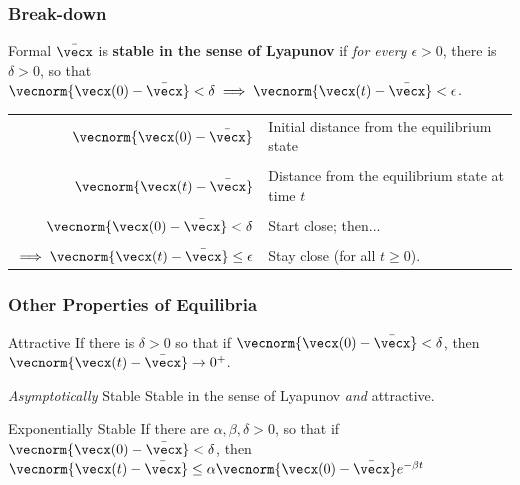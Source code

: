 \documentclass[12pt]{beamer}
\begin{document}
\begin{frame}
\frametitle{Break-down}

\begin{block}{Formal}
$\bar\vecx$ is \textbf{stable in the sense of Lyapunov} if
\emph{for every $\epsilon > 0$}, there is $\delta >0$, so that
$\vecnorm{\vecx(0)-\bar\vecx} < \delta
 \implies \vecnorm{\vecx(t) - \bar\vecx} < \epsilon$. 
\end{block}

\begin{tabular}{rp{.6\linewidth}}
$\vecnorm{\vecx(0)-\bar\vecx}$
	& Initial distance from the equilibrium state \\ \\
	
$\vecnorm{\vecx(t)-\bar\vecx}$
	& Distance from the equilibrium state at time $t$ \\ \\
	
$\vecnorm{\vecx(0)-\bar\vecx} < \delta$
	& Start close; then... \\ \\

$\implies \vecnorm{\vecx(t)-\bar\vecx} \leq \epsilon$
	& Stay close (for all $t \geq 0$). \\

\end{tabular}

\vfill\null

\end{frame}





\begin{frame}
\frametitle{Other Properties of Equilibria}

\begin{block}{Attractive}
If there is $\delta > 0$ so that if $\vecnorm{\vecx(0)-\bar\vecx} < \delta$, then
$\vecnorm{\vecx(t)-\bar{\vecx}} \to 0^+$.
\end{block}

\begin{block}{\emph{Asymptotically} Stable}
Stable in the sense of Lyapunov \emph{and} attractive.
\end{block}

\begin{block}{Exponentially Stable}
If there are $\alpha, \beta, \delta >0$, so that if
$\vecnorm{\vecx(0)-\bar{\vecx}} < \delta$, then
$\vecnorm{\vecx(t)-\bar\vecx}
	\leq \alpha \vecnorm{\vecx(0)-\bar\vecx} e^{-\beta t}$
\end{block}

\end{frame}
\end{document}
